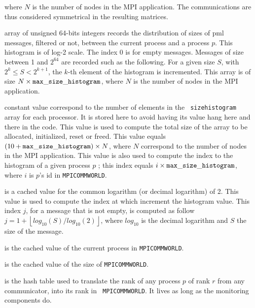 \begin{description}
  where $N$ is the number of nodes in the MPI application. The
  communications are thus considered symmetrical in the resulting
  matrices.
\item[{\tt size\brkunds{}histogram}] array of unsigned 64-bits
  integers records the distribution of sizes of pml messages, filtered
  or not, between the current process and a process $p$. This
  histogram is of log-2 scale. The index 0 is for empty
  messages. Messages of size between 1 and $2^{64}$ are recorded such
  as the following. For a given size $S$, with $2^k \le S < 2^{k+1}$,
  the $k$-th element of the histogram is incremented. This array is of
  size $N \times {\tt max\allowbreak\_{}size\allowbreak\_{}histogram}$, where
  $N$ is the number of nodes in the MPI application.
\item[{\tt max\brkunds{}size\brkunds{}histogram}] constant value
  correspond to the number of elements in the {\tt
    size\brkunds{}histo\allowbreak{}gram} array for each processor. It
  is stored here to avoid having its value hang here and there in the
  code. This value is used to compute the total size of the array to
  be allocated, initialized, reset or freed. This value equals $(10 +
  {\tt max\allowbreak\_{}size\allowbreak\_{}histogram}) \times N$, where $N$
  correspond to the number of nodes in the MPI application. This value
  is also used to compute the index to the histogram of a given
  process $p$ ; this index equals $i \times {\tt
    max\allowbreak\_{}size\allowbreak\_{}histogram}$, where $i$ is $p$'s id in
  {\tt MPI\brkunds{}COMM\brkunds{}WORLD}.
\item[{\tt log10\brkunds{}2}] is a cached value for the common
  logarithm (or decimal logarithm) of 2. This value is used to compute
  the index at which increment the histogram value. This index $j$,
  for a message that is not empty, is computed as follow $j = 1 +
  \left \lfloor{log_{10}(S)/log_{10}(2)} \right \rfloor$, where
  $log_{10}$ is the decimal logarithm and $S$ the size of the message.
\item[{\tt rank\brkunds{}world}] is the cached value of the current
  process in {\tt MPI\brkunds{}COMM\brkunds{}WORLD}.
\item[{\tt nprocs\brkunds{}world}] is the cached value of the size of
  {\tt MPI\brkunds{}COMM\brkunds{}WORLD}.
\item[{\tt
    common\brkunds{}monitoring\brkunds{}translation\brkunds{}ht}] is
  the hash table used to translate the rank of any process $p$ of rank
  $r$ from any communicator, into its rank in {\tt
    MPI\brkunds{}COMM\brkunds{}WORLD}. It lives as long as the
  monitoring components do.
\end{description}

